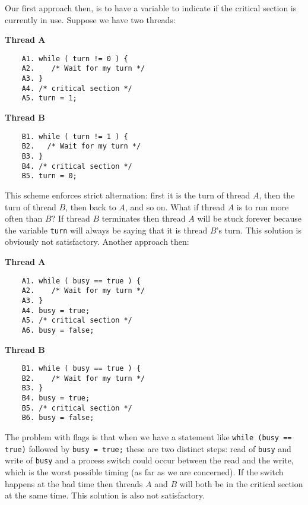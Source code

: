 Our first approach then, is to have a variable to indicate if the critical section is currently in use. Suppose we have two threads:

\begin{multicols}{2}
\textbf{Thread A}\vspace{-2em}
	\begin{verbatim}
	A1. while ( turn != 0 ) {
	A2.    /* Wait for my turn */
	A3. }
	A4. /* critical section */
	A5. turn = 1;
	\end{verbatim}
\columnbreak
\textbf{Thread B}\vspace{-2em}
	\begin{verbatim}
	B1. while ( turn != 1 ) {
	B2.   /* Wait for my turn */
	B3. }
	B4. /* critical section */
	B5. turn = 0;
	\end{verbatim}
\end{multicols}

This scheme enforces strict alternation: first it is the turn of thread $A$, then the turn of thread $B$, then back to $A$, and so on. What if thread $A$ is to run more often than $B$? If thread $B$ terminates then thread $A$ will be stuck forever because the variable \texttt{turn} will always be saying that it is thread $B$'s turn. This solution is obviously not satisfactory. Another approach then:

\begin{multicols}{2}
\textbf{Thread A}\vspace{-2em}
	\begin{verbatim}
	A1. while ( busy == true ) {
	A2.    /* Wait for my turn */
	A3. }
	A4. busy = true;
	A5. /* critical section */
	A6. busy = false;
	\end{verbatim}
\columnbreak
\textbf{Thread B}\vspace{-2em}
	\begin{verbatim}
	B1. while ( busy == true ) {
	B2.    /* Wait for my turn */
	B3. }
	B4. busy = true;
	B5. /* critical section */
	B6. busy = false;
	\end{verbatim}
\end{multicols}


The problem with flags is that when we have a statement like \texttt{while (busy == true)} followed by \texttt{busy = true;} these are two distinct steps: read of \texttt{busy} and write of \texttt{busy} and a process switch could occur between the read and the write, which is the worst possible timing (as far as we are concerned). If the switch happens at the bad time then threads $A$ and $B$ will both be in the critical section at the same time. This solution is also not satisfactory.


